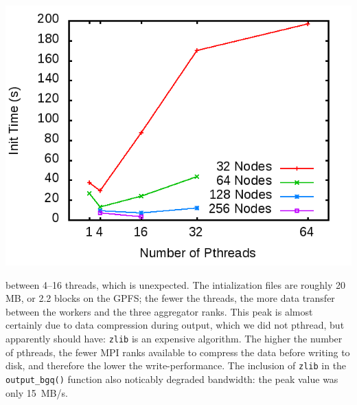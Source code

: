 \documentclass[11pt]{article}
\begin{document}
\begin{multicols*}{2}
\begin{center}
\begin{minipage}{0.4\textwidth}
  \includegraphics[width=\textwidth]{img/pr-init}
\end{minipage}
\end{center}
between 4--16 threads, which is unexpected.
The intialization files are roughly 20 MB, or 2.2 blocks on the GPFS;
the fewer the threads, the more data transfer between the workers and the three aggregator ranks.
This peak is almost certainly due to data compression during output, which we did not pthread, but apparently should have:
\texttt{zlib} is an expensive algorithm.
The higher the number of pthreads, the fewer MPI ranks available to compress the data before writing to disk, and therefore the lower the write-performance.
The inclusion of \texttt{zlib} in the \texttt{output\_bgq()} function also noticably degraded bandwidth:
the peak value was only 15~MB/s.


\end{multicols*}
\end{document}
